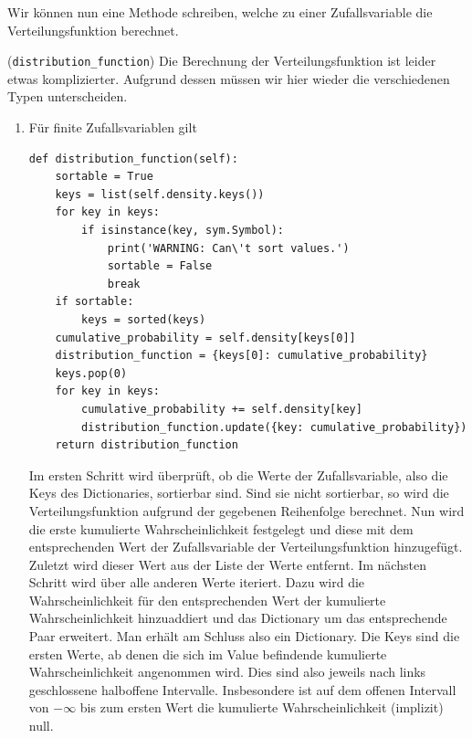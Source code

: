 \newpage

Wir können nun eine Methode schreiben, welche zu einer Zufallsvariable die Verteilungsfunktion berechnet.

\begin{Code}{(\lstinline|distribution_function|)}
Die Berechnung der Verteilungsfunktion ist leider etwas komplizierter. Aufgrund dessen müssen wir hier wieder die verschiedenen Typen unterscheiden.
\begin{enumerate}[label=(\roman*)]
\item Für finite Zufallsvariablen gilt
\begin{lstlisting}
def distribution_function(self):
    sortable = True
    keys = list(self.density.keys())
    for key in keys:
        if isinstance(key, sym.Symbol):
            print('WARNING: Can\'t sort values.')
            sortable = False
            break
    if sortable:
        keys = sorted(keys)
    cumulative_probability = self.density[keys[0]]
    distribution_function = {keys[0]: cumulative_probability}
    keys.pop(0)
    for key in keys:
        cumulative_probability += self.density[key]
        distribution_function.update({key: cumulative_probability})
    return distribution_function
\end{lstlisting}
Im ersten Schritt wird überprüft, ob die Werte der Zufallsvariable, also die Keys des Dictionaries, sortierbar sind. Sind sie nicht sortierbar, so wird die Verteilungsfunktion aufgrund der gegebenen Reihenfolge berechnet. Nun wird die erste kumulierte Wahrscheinlichkeit festgelegt und diese mit dem entsprechenden Wert der Zufallsvariable der Verteilungsfunktion hinzugefügt. Zuletzt wird dieser Wert aus der Liste der Werte entfernt. Im nächsten Schritt wird über alle anderen Werte iteriert. Dazu wird die Wahrscheinlichkeit für den entsprechenden Wert der kumulierte Wahrscheinlichkeit hinzuaddiert und das Dictionary um das entsprechende Paar erweitert. Man erhält am Schluss also ein Dictionary. Die Keys sind die ersten Werte, ab denen die sich im Value befindende kumulierte Wahrscheinlichkeit angenommen wird. Dies sind also jeweils nach links geschlossene halboffene Intervalle. Insbesondere ist auf dem offenen Intervall von $- \infty$ bis zum ersten Wert die kumulierte Wahrscheinlichkeit (implizit) null. 


\end{enumerate}
\end{Code}
